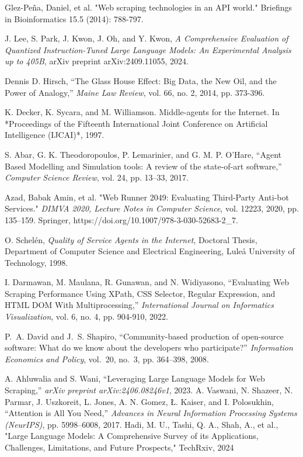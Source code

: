 \begin{thebibliography}{1}
 Glez-Peña, Daniel, et al. "Web scraping technologies in an API world." Briefings in Bioinformatics 15.5 (2014): 788-797.

J. Lee, S. Park, J. Kwon, J. Oh, and Y. Kwon, 
\textit{A Comprehensive Evaluation of Quantized Instruction-Tuned Large Language Models: An Experimental Analysis up to 405B}, 
arXiv preprint arXiv:2409.11055, 2024.

Dennis D. Hirsch, ``The Glass House Effect: Big Data, the New Oil, and the Power of Analogy,'' \textit{Maine Law Review}, vol. 66, no. 2, 2014, pp. 373-396.

K. Decker, K. Sycara, and M. Williamson. Middle-agents for the Internet. In *Proceedings of the Fifteenth International Joint Conference on Artificial Intelligence (IJCAI)*, 1997.

    S. Abar, G. K. Theodoropoulos, P. Lemarinier, and G. M. P. O’Hare, ``Agent Based Modelling and Simulation tools: A review of the state-of-art software,'' \emph{Computer Science Review}, vol. 24, pp. 13–33, 2017.

 Azad, Babak Amin, et al. "Web Runner 2049: Evaluating Third-Party Anti-bot Services." \textit{DIMVA 2020, Lecture Notes in Computer Science}, vol. 12223, 2020, pp. 135–159. Springer, https://doi.org/10.1007/978-3-030-52683-2\_7.

O. Schelén, \emph{Quality of Service Agents in the Internet}, Doctoral Thesis, Department of Computer Science and Electrical Engineering, Luleå University of Technology, 1998.

I. Darmawan, M. Maulana, R. Gunawan, and N. Widiyasono, ``Evaluating Web Scraping Performance Using XPath, CSS Selector, Regular Expression, and HTML DOM With Multiprocessing,'' \emph{International Journal on Informatics Visualization}, vol. 6, no. 4, pp. 904-910, 2022.

P.~A. David and J.~S. Shapiro, ``Community-based production of open-source software: What do we know about the developers who participate?'' \emph{Information Economics and Policy}, vol.~20, no.~3, pp. 364–398, 2008.

    A. Ahluwalia and S. Wani, ``Leveraging Large Language Models for Web Scraping,'' \emph{arXiv preprint arXiv:2406.08246v1}, 2023.
A. Vaswani, N. Shazeer, N. Parmar, J. Uszkoreit, L. Jones, A. N. Gomez, Ł. Kaiser, and I. Polosukhin, ``Attention is All You Need,'' \textit{Advances in Neural Information Processing Systems (NeurIPS)}, pp. 5998--6008, 2017.
  Hadi, M. U., Tashi, Q. A., Shah, A., et al., "Large Language Models: A Comprehensive Survey of its Applications, Challenges, Limitations, and Future Prospects," TechRxiv, 2024


\end{thebibliography}

